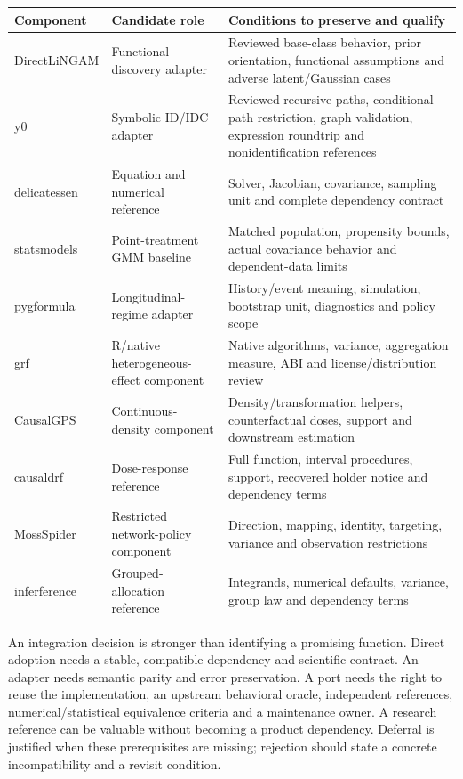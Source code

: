 \begin{longtable}{p{}p{}p{}}
\toprule
Component & Candidate role & Conditions to preserve and qualify\\
\midrule
\endhead
DirectLiNGAM & Functional discovery adapter & Reviewed base-class behavior, prior orientation,
functional assumptions and adverse latent/Gaussian cases\\
y0 & Symbolic ID/IDC adapter & Reviewed recursive paths, conditional-path restriction,
graph validation, expression roundtrip and nonidentification references\\
delicatessen & Equation and numerical reference & Solver, Jacobian, covariance,
sampling unit and complete dependency contract\\
statsmodels & Point-treatment GMM baseline & Matched population, propensity bounds,
actual covariance behavior and dependent-data limits\\
pygformula & Longitudinal-regime adapter & History/event meaning, simulation,
bootstrap unit, diagnostics and policy scope\\
grf & R/native heterogeneous-effect component & Native algorithms, variance,
aggregation measure, ABI and license/distribution review\\
CausalGPS & Continuous-density component & Density/transformation helpers,
counterfactual doses, support and downstream estimation\\
causaldrf & Dose-response reference & Full function, interval procedures,
support, recovered holder notice and dependency terms\\
MossSpider & Restricted network-policy component & Direction, mapping, identity,
targeting, variance and observation restrictions\\
inferference & Grouped-allocation reference & Integrands, numerical defaults,
variance, group law and dependency terms\\
\bottomrule
\end{longtable}

An integration decision is stronger than identifying a promising function.
Direct adoption needs a stable, compatible dependency and scientific contract.
An adapter needs semantic parity and error preservation. A port needs the right
to reuse the implementation, an upstream behavioral oracle, independent
references, numerical/statistical equivalence criteria and a maintenance owner.
A research reference can be valuable without becoming a product dependency.
Deferral is justified when these prerequisites are missing; rejection should
state a concrete incompatibility and a revisit condition.

